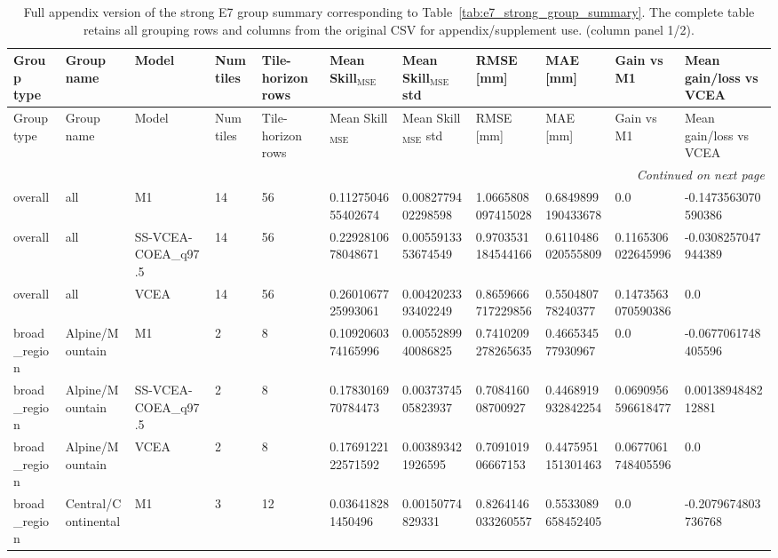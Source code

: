 \begin{landscape}
\scriptsize
\setlength{\LTleft}{0pt}
\setlength{\LTright}{0pt}
\begin{longtable}{lllllllllll}
\caption{Full appendix version of the strong E7 group summary corresponding to Table~\ref{tab:e7_strong_group_summary}. The complete table retains all grouping rows and columns from the original CSV for appendix/supplement use. (column panel 1/2).}\label{tab:e7_strong_group_summary_full}\\
\toprule
Group type & Group name & Model & Num tiles & Tile-horizon rows & Mean Skill$_{\mathrm{MSE}}$ & Mean Skill$_{\mathrm{MSE}}$ std & RMSE [mm] & MAE [mm] & Gain vs M1 & Mean gain/loss vs VCEA \\
\midrule
\endfirsthead
\toprule
Group type & Group name & Model & Num tiles & Tile-horizon rows & Mean Skill$_{\mathrm{MSE}}$ & Mean Skill$_{\mathrm{MSE}}$ std & RMSE [mm] & MAE [mm] & Gain vs M1 & Mean gain/loss vs VCEA \\
\midrule
\endhead
\midrule
\multicolumn{11}{r}{\textit{Continued on next page}} \\
\endfoot
\bottomrule
\endlastfoot
overall & all & M1 & 14 & 56 & 0.1127504655402674 & 0.0082779402298598 & 1.0665808097415028 & 0.6849899190433678 & 0.0 & -0.1473563070590386 \\
overall & all & SS-VCEA-COEA\_q97.5 & 14 & 56 & 0.2292810678048671 & 0.0055913353674549 & 0.9703531184544166 & 0.6110486020555809 & 0.1165306022645996 & -0.0308257047944389 \\
overall & all & VCEA & 14 & 56 & 0.2601067725993061 & 0.0042023393402249 & 0.8659666717229856 & 0.550480778240377 & 0.1473563070590386 & 0.0 \\
broad\_region & Alpine/Mountain & M1 & 2 & 8 & 0.1092060374165996 & 0.0055289940086825 & 0.7410209278265635 & 0.466534577930967 & 0.0 & -0.0677061748405596 \\
broad\_region & Alpine/Mountain & SS-VCEA-COEA\_q97.5 & 2 & 8 & 0.1783016970784473 & 0.0037374505823937 & 0.708416008700927 & 0.4468919932842254 & 0.0690956596618477 & 0.0013894848212881 \\
broad\_region & Alpine/Mountain & VCEA & 2 & 8 & 0.1769122122571592 & 0.003893421926595 & 0.709101906667153 & 0.4475951151301463 & 0.0677061748405596 & 0.0 \\
broad\_region & Central/Continental & M1 & 3 & 12 & 0.036418281450496 & 0.00150774829331 & 0.8264146033260557 & 0.5533089658452405 & 0.0 & -0.2079674803736768 \\

\end{longtable}
\end{landscape}
